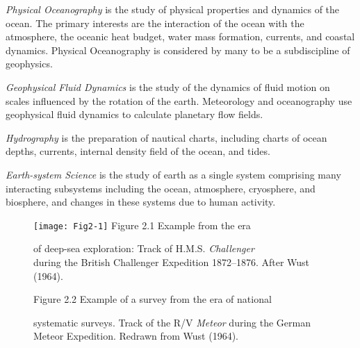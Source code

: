 \textit{Physical Oceanography} is the study of
physical properties and dynamics of the ocean. The primary interests are the interaction of
the ocean with the atmosphere, the oceanic heat budget, water mass formation, currents, and
coastal dynamics. Physical Oceanography is considered by many to be a subdiscipline of
geophysics.

\textit{Geophysical Fluid Dynamics} is the study of
the dynamics of fluid motion on scales influenced by the rotation of the earth. Meteorology
and oceanography use geophysical fluid dynamics to calculate planetary flow fields.

\textit{Hydrography} is the preparation of nautical charts, including charts of ocean
depths, currents, internal density field of the ocean, and tides.

\textit{Earth-system Science} is the study of earth as a single system comprising many interacting subsystems including the ocean, atmosphere, cryosphere, and biosphere, and changes in these systems due to human activity.

\begin{figure}[t!]
\texttt{[image: Fig2-1]}
\centering
\footnotesize
Figure 2.1 Example from the era\rule{0pt}{3ex} of deep-sea exploration: Track of
H.M.S. \textit{Challenger}\\ during the British Challenger Expedition
1872--1876. After Wust (1964).

\label{fig:Fig2-1}
\vspace{-3ex}
\end{figure}


\begin{figure}[t!]
\centering
\footnotesize
Figure 2.2 Example of a survey from the era of national\rule{0pt}{3ex} systematic
surveys. Track of the R/V \textit{Meteor} during the German Meteor Expedition. Redrawn from
Wust (1964).

\label{fig:Fig2-2}
\vspace{-3ex}
\end{figure}
